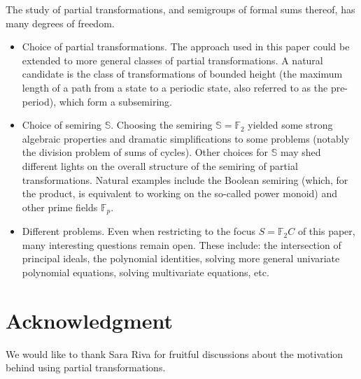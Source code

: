 \documentclass[a4paper, 11pt]{article}
\theoremstyle{plain}
\theoremstyle{definition}
\newcommand{\F} {\mathbb{F}}
\renewcommand{\S}{\mathbb{S}}
\begin{document}
The study of partial transformations, and semigroups of formal sums thereof, has many degrees of freedom.
\begin{itemize}
	\item Choice of partial transformations. The approach used in this paper could be extended to more general classes of partial transformations. A natural candidate is the class of transformations of bounded height (the maximum length of a path from a state to a periodic state, also referred to as the pre-period), which form a subsemiring.

	\item Choice of semiring $\S$. Choosing the semiring $\S = \F_2$ yielded some strong algebraic properties and dramatic simplifications to some problems (notably the division problem of sums of cycles). Other choices for $\S$ may shed different lights on the overall structure of the semiring of partial transformations. Natural examples include the Boolean semiring (which, for the product, is equivalent to working on the so-called power monoid) and other prime fields $\F_p$.

	\item Different problems. Even when restricting to the focus $S = \F_2 C$ of this paper, many interesting questions remain open. These include: the intersection of principal ideals, the polynomial identities, solving more general univariate polynomial equations, solving multivariate equations, etc.
\end{itemize}




\section*{Acknowledgment}

We would like to thank Sara Riva for fruitful discussions about the motivation behind using partial transformations.

% 
% 
\end{document}
